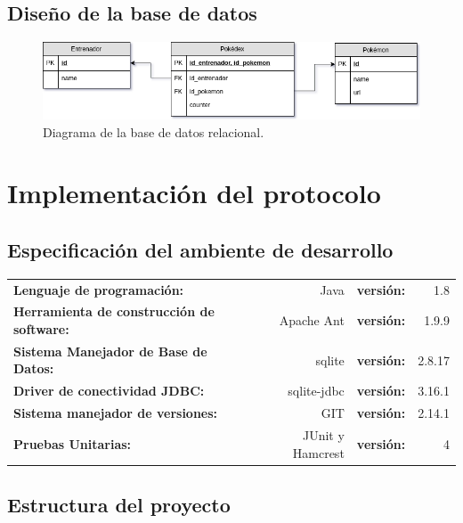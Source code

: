 \documentclass[12pt]{article}
\begin{document}
\subsection{Diseño de la base de datos}
 \begin{figure}[H]
   \centering
   \includegraphics[width=1\textwidth]{PokeDB2}
   \caption{Diagrama de la base de datos relacional.}
 \end{figure}

\section{Implementación del protocolo}
\subsection{Especificación del ambiente de desarrollo}\label{sec:env}
\begin{tabular}{l r l r}
  \textbf{Lenguaje de programación:} & Java & \textbf{versión:} & 1.8 \\
  \textbf{Herramienta de construcción de software:} & Apache Ant & \textbf{versión:} & 1.9.9 \\
  \textbf{Sistema Manejador de Base de Datos:} & sqlite & \textbf{versión:} & 2.8.17 \\
  \textbf{Driver de conectividad JDBC:} & sqlite-jdbc & \textbf{versión:}& 3.16.1\\
  \textbf{Sistema manejador de versiones:} & GIT & \textbf{versión:}& 2.14.1 \\
  \textbf{Pruebas Unitarias:} & JUnit y Hamcrest & \textbf{versión:}& 4 \\
  
\end{tabular}

\subsection{Estructura del proyecto}
\end{document}
